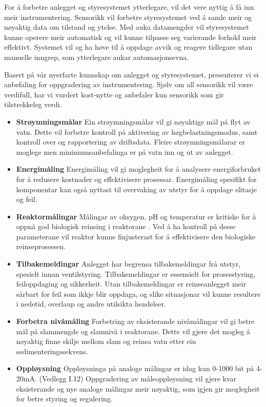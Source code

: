 For å forbetre anlegget og styresystemet ytterlegare, vil det vere nyttig å få inn meir instrumentering. 
Sensorikk vil forbetre styresystemet ved å samle meir og nøyaktig data om tilstand og ytelse. 
Med auka datamengder vil styresystemet kunne operere meir automatisk og vil kunne tilpasse seg varierande forhold meir effektivt. 
Systemet vil og ha høve til å oppdage avvik og reagere tidlegare utan manuelle inngrep, som ytterlegare aukar automasjonsevna.

Basert på vår nyerfarte kunnskap om anlegget og styresystemet, presenterer vi ei
anbefaling for oppgradering av instrumentering. 
Sjølv om all sensorikk vil være verdifull, har vi vurdert kost-nytte og anbefaler kun sensorikk som gir tilstrekkeleg verdi.


\begin{itemize}
    \item \textbf{Strøymningsmålar} \newline
        Ein strøymningsmålar vil gi nøyaktige mål på flyt av vatn.
        Dette vil forbetre kontroll på aktivering av høgbelastningsmodus, samt kontroll over og rapportering av driftsdata.
        Fleire strøymningsmålarar er moglege men minimumsanbefalinga er på vatn inn og ut av anlegget.
    \item \textbf{Energimåling} \newline
        Energimåling vil gi moglegheit for å analysere energiforbruket for å redusere kostnader og effektivisere prosessar.
        Energimåling spesifikt for komponentar kan også nyttast til overvaking av utstyr for å oppdage slitasje og feil.
    \item \textbf{Reaktormålingar} \newline
        Målingar av oksygen, pH og temperatur er kritiske for å oppnå god biologisk reinsing i reaktorane \citep{SNL_PH}. \newline
        Ved å ha kontroll på desse parameterane vil reaktor kunne finjusterast for å effektivisere den biologiske reinseprosessen.
    \item \textbf{Tilbakemeldingar} \newline
        Anlegget har begrensa tilbakemeldingar frå utstyr, spesielt innan ventilstyring.
        Tilbakemeldingar er essensielt for prosesstyring, feiloppdaging og sikkerheit.
        Utan tilbakemeldingar er reinseanlegget meir sårbart for feil som ikkje blir oppdaga, 
        og slike situasjonar vil kunne resultere i nedetid, overlaup og andre utilsikta hendelser.
    \item \textbf{Forbetra nivåmåling} \newline
        Forbetring av eksisterande nivåmålingar vil gi betre mål på slammengde og slamnivå i reaktorane.
        Dette vil gjere det mogleg å nøyaktig finne skilje mellom slam og reinsa vatn etter ein sedimenteringssekvens.
    \item \textbf{Oppløysning} \newline
        Oppløysninga på analoge målingar er idag kun 0-1000 bit på 4-20mA. (Vedlegg I.12)\newline
        Oppgradering av måleoppløysning vil gjere kvar eksisterande og nye analoge målingar
        meir nøyaktig, som igjen gir moglegheit for betre styring og regulering.
\end{itemize}
\newpage


